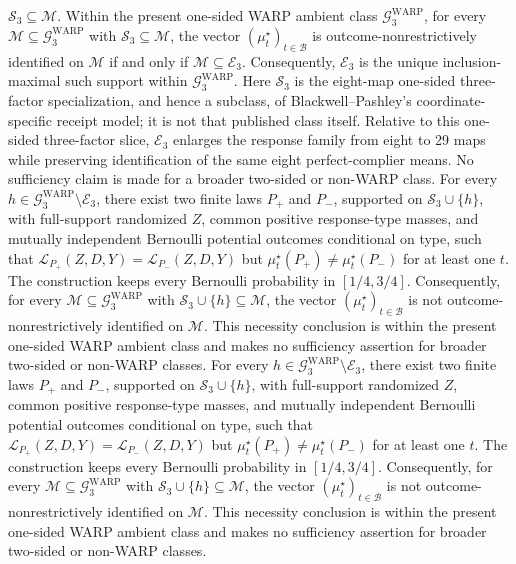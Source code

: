 \(\mathcal S_3\subseteq\mathcal M\).
Within the present one-sided WARP ambient class \(\mathcal G^{\mathrm{WARP}}_3\), for every \(\mathcal M\subseteq\mathcal G^{\mathrm{WARP}}_3\) with \(\mathcal S_3\subseteq\mathcal M\), the vector \((\mu_t^\star)_{t\in\mathcal B}\) is outcome-nonrestrictively identified on \(\mathcal M\) if and only if \(\mathcal M\subseteq\mathcal E_3\). Consequently, \(\mathcal E_3\) is the unique inclusion-maximal such support within \(\mathcal G^{\mathrm{WARP}}_3\). Here \(\mathcal S_3\) is the eight-map one-sided three-factor specialization, and hence a subclass, of Blackwell--Pashley's coordinate-specific receipt model; it is not that published class itself. Relative to this one-sided three-factor slice, \(\mathcal E_3\) enlarges the response family from eight to 29 maps while preserving identification of the same eight perfect-complier means. No sufficiency claim is made for a broader two-sided or non-WARP class.
For every \(h\in\mathcal G^{\mathrm{WARP}}_3\setminus\mathcal E_3\), there exist two finite laws \(P_+\) and \(P_-\), supported on \(\mathcal S_3\cup\{h\}\), with full-support randomized \(Z\), common positive response-type masses, and mutually independent Bernoulli potential outcomes conditional on type, such that \(\mathcal L_{P_+}(Z,D,Y)=\mathcal L_{P_-}(Z,D,Y)\) but \(\mu_t^\star(P_+)\ne\mu_t^\star(P_-)\) for at least one \(t\). The construction keeps every Bernoulli probability in \([1/4,3/4]\). Consequently, for every \(\mathcal M\subseteq\mathcal G^{\mathrm{WARP}}_3\) with \(\mathcal S_3\cup\{h\}\subseteq\mathcal M\), the vector \((\mu_t^\star)_{t\in\mathcal B}\) is not outcome-nonrestrictively identified on \(\mathcal M\). This necessity conclusion is within the present one-sided WARP ambient class and makes no sufficiency assertion for broader two-sided or non-WARP classes.
For every \(h\in\mathcal G^{\mathrm{WARP}}_3\setminus\mathcal E_3\), there exist two finite laws \(P_+\) and \(P_-\), supported on \(\mathcal S_3\cup\{h\}\), with full-support randomized \(Z\), common positive response-type masses, and mutually independent Bernoulli potential outcomes conditional on type, such that \(\mathcal L_{P_+}(Z,D,Y)=\mathcal L_{P_-}(Z,D,Y)\) but \(\mu_t^\star(P_+)\ne\mu_t^\star(P_-)\) for at least one \(t\). The construction keeps every Bernoulli probability in \([1/4,3/4]\). Consequently, for every \(\mathcal M\subseteq\mathcal G^{\mathrm{WARP}}_3\) with \(\mathcal S_3\cup\{h\}\subseteq\mathcal M\), the vector \((\mu_t^\star)_{t\in\mathcal B}\) is not outcome-nonrestrictively identified on \(\mathcal M\). This necessity conclusion is within the present one-sided WARP ambient class and makes no sufficiency assertion for broader two-sided or non-WARP classes.
